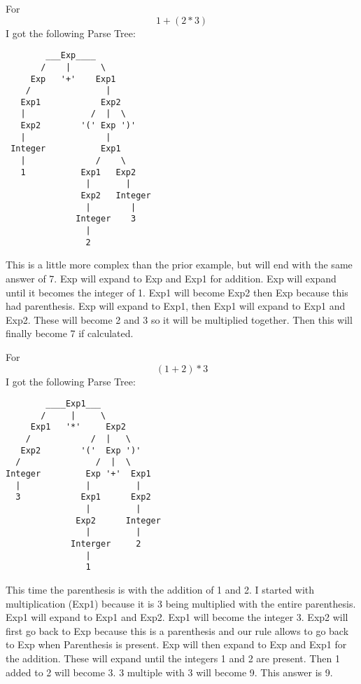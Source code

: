 \documentclass{article}
\theoremstyle{theorem}
\theoremstyle{definition}
\theoremstyle{remark}
\begin{document}
\noindent\newline\newline For $$1+(2*3)$$ I got the following Parse Tree:
\begin{verbatim}
        ___Exp____
       /    |      \
     Exp   '+'    Exp1
    /               |
   Exp1            Exp2
   |             /  |  \
   Exp2        '(' Exp ')'
   |                |
 Integer           Exp1
   |              /    \
   1           Exp1   Exp2
                |       |
               Exp2   Integer
                |        |
              Integer    3
                |
                2

\end{verbatim}
\noindent\newline This is a little more complex than the prior example, but will end with the same answer of 7. Exp will expand to Exp and Exp1 for addition. Exp will expand until it becomes the integer of 1. Exp1 will become Exp2 then Exp because this had parenthesis. Exp will expand to Exp1, then Exp1 will expand to Exp1 and Exp2. These will become 2 and 3 so it will be multiplied together. Then this will finally become 7 if calculated.


\noindent\newline\newline For $$(1+2)*3$$ I got the following Parse Tree:
\begin{verbatim}
        ____Exp1___
       /     |     \
     Exp1   '*'     Exp2
    /            /  |   \
   Exp2        '('  Exp ')'
  /               /  |  \
Integer         Exp '+'  Exp1
  |             |         |
  3            Exp1      Exp2
                |         |
              Exp2      Integer
                |         |
             Interger     2
                |
                1

\end{verbatim}
\noindent\newline This time the parenthesis is with the addition of 1 and 2. I started with multiplication (Exp1) because it is 3 being multiplied with the entire parenthesis. Exp1 will expand to Exp1 and Exp2. Exp1 will become the integer 3. Exp2 will first go back to Exp because this is a parenthesis and our rule allows to go back to Exp when Parenthesis is present. Exp will then expand to Exp and Exp1 for the addition. These will expand until the integers 1 and 2 are present. Then 1 added to 2 will become 3. 3 multiple with 3 will become 9. This answer is 9.
\end{document}
